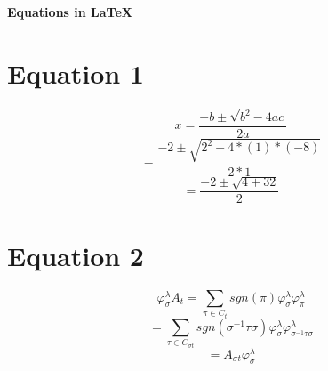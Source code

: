 \documentclass[10pt,a4paper]{article}
\begin{document}
\begin{center}
\Large{\textbf{Equations in \LaTeX}}
\end{center}
\section*{Equation 1}
\begin{fleqn}
\[x = \frac{-b \pm \sqrt{b^{2}-4ac}}{2a}\]
\[= \frac{-2 \pm \sqrt{2^{2}-4*(1)*(-8)}}{2*1}\]
\[= \frac{-2 \pm \sqrt{4+32}}{2}\]
\end{fleqn}
\section*{Equation 2}
\begin{fleqn}
\[\varphi^{\lambda}_{\sigma}A_{t} = \sum_{\pi \in C_{t}}
sgn(\pi)\varphi^{\lambda}_{\sigma}\varphi^{\lambda}_{\pi}\]
\[= \sum_{\tau \in C_{\sigma t}} sgn(\sigma^{-
1}\tau\sigma)\varphi^{\lambda}_{\sigma}\varphi^{\lambda}_{\sigma^{-
1}\tau\sigma}\]
\[= A_{\sigma t} \varphi^{\lambda}_{\sigma}\]
\end{fleqn}
\end{document}
